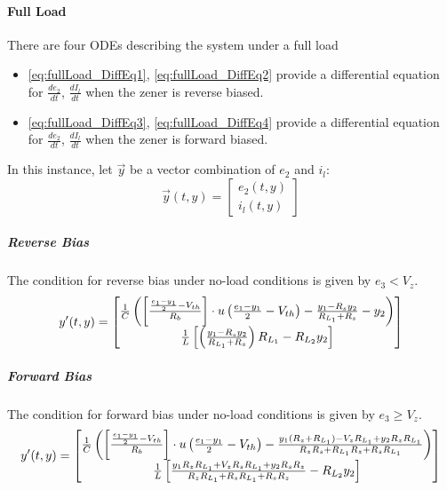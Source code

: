 \paragraph{Full Load}
There are four ODEs describing the system under a full load
\begin{itemize}
	\item \eqref{eq:fullLoad_DiffEq1}, \eqref{eq:fullLoad_DiffEq2} provide a differential equation for $\frac{de_2}{dt}$, $\frac{dI_l}{dt}$ when the zener is reverse biased.
	\item \eqref{eq:fullLoad_DiffEq3}, \eqref{eq:fullLoad_DiffEq4} provide a differential equation for $\frac{de_2}{dt}$, $\frac{dI_l}{dt}$ when the zener is forward biased.
\end{itemize}
In this instance, let $\vec{y}$ be a vector combination of $e_2$ and $i_l$:
\begin{equation}
	\vec{y}(t,y) = \begin{bmatrix}
		e_2(t,y) \\
		i_l(t,y)
	\end{bmatrix}
\end{equation}
\subparagraph{Reverse Bias}
The condition for reverse bias under no-load conditions is given by $e_3 < V_z$.
\begin{equation}
	y'(t,y) = \begin{bmatrix}
		 \frac{1}{C}\left(\left[\frac{\frac{e_1 - y_1}{2} - V_{th}}{R_b} \right]\cdot u\left(\frac{e_1 - y_1}{2} - V_{th} \right) - \frac{y_1 - R_s y_2}{R_{L_1} + R_s} - y_2 \right) \\
		 \frac{1}{L} \left[
		 	\left(\frac{y_1 - R_s y_2}{R_{L_1} + R_s} \right)R_{L_1} - R_{L_2}y_2
		  \right]
	\end{bmatrix}
\end{equation}
\subparagraph{Forward Bias}
The condition for forward bias under no-load conditions is given by $e_3 \geq V_z$.  
\begin{equation}
	y'(t,y) = \begin{bmatrix}
		 \frac{1}{C}\left(\left[\frac{\frac{e_1 - y_1}{2} - V_{th}}{R_b} \right]\cdot u\left(\frac{e_1 - y_1}{2} - V_{th} \right) - \frac{y_1 (R_z + R_{L_1}) - V_z R_{L_1} + y_2 R_z R_{L_1}}{R_z R_s + R_{L_1} R_z + R_s R_{L_1}} \right) \\
		 \frac{1}{L} \left[\frac{y_1 R_z R_{L_1} + V_z R_s R_{L_1} + y_2 R_s R_z}{R_z R_{L_1} + R_s R_{L_1} + R_s R_z} - R_{L_2}y_2 \right]
	\end{bmatrix}
\end{equation}